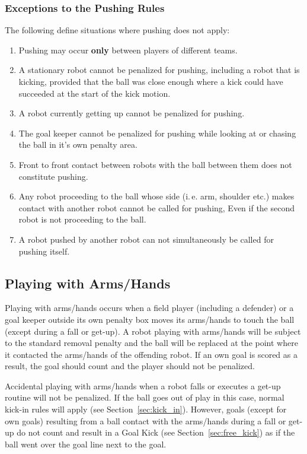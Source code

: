 \documentclass[12pt]{article}
\newcommand{\ie}{\mbox{i.\,e.}\xspace}
\newcommand{\cf}{see\xspace}
\begin{document}
\subsubsection{Exceptions to the Pushing Rules}
\label{sec:situations_no_pushing}

The following define situations where pushing does not apply:

\begin{enumerate}
  \item Pushing may occur \textbf{only} between players of different teams.
  \item A stationary robot cannot be penalized for pushing, including a robot that is kicking, provided that the ball was close enough where a kick could have succeeded at the start of the kick motion.
  \item A robot currently getting up cannot be penalized for pushing.
  \item The goal keeper cannot be penalized for pushing while looking at or chasing the ball in it's own penalty area.
  \item Front to front contact between robots with the ball between them does not constitute pushing.
  \item Any robot proceeding to the ball whose side (\ie arm, shoulder etc.) makes contact with another robot cannot be called for pushing, Even if the second robot is not proceeding to the ball.
  \item A robot pushed by another robot can not simultaneously be called for pushing itself.
\end{enumerate}

\subsection{Playing with Arms/Hands}
\label{sec:hand_ball}

Playing with arms/hands occurs when a field player (including a defender) or a goal keeper outside its own penalty box moves its arms/hands to touch the ball (except during a fall or get-up). A robot playing with arms/hands will be subject to the standard removal penalty and the ball will be replaced at the point where it contacted the arms/hands of the offending robot.  If an own goal is scored as a result, the goal should count and the player should not be penalized.

Accidental playing with arms/hands when a robot falls or executes a get-up routine will not be penalized. If the ball goes out of play in this case, normal kick-in rules will apply (\cf Section~\ref{sec:kick_in}). However, goals (except for own goals) resulting from a ball contact with the arms/hands during a fall or get-up do not count and result in a Goal Kick (\cf Section~\ref{sec:free_kick}) as if the ball went over the goal line next to the goal.
\end{document}

